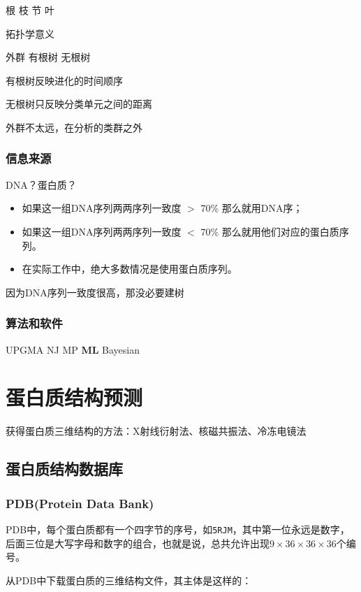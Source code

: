 根 枝 节 叶

拓扑学意义

外群 有根树 无根树

有根树反映进化的时间顺序

无根树只反映分类单元之间的距离

外群不太远，在分析的类群之外

\subsubsection{信息来源}

DNA？蛋白质？

\begin{itemize}
	\item 如果这一组DNA序列两两序列一致度 $>$ 70\% 那么就用DNA序；
	\item 如果这一组DNA序列两两序列一致度 $<$ 70\% 那么就用他们对应的蛋白质序列。
	\item 在实际工作中，绝大多数情况是使用蛋白质序列。
\end{itemize}

因为DNA序列一致度很高，那没必要建树

\subsubsection{算法和软件}

UPGMA NJ MP \textbf{ML} Bayesian


\section{蛋白质结构预测}

获得蛋白质三维结构的方法：X射线衍射法、核磁共振法、冷冻电镜法

\subsection{蛋白质结构数据库}

\subsubsection{PDB(Protein Data Bank)}

PDB中，每个蛋白质都有一个四字节的序号，如\texttt{5RJM}，其中第一位永远是数字，后面三位是大写字母和数字的组合，也就是说，总共允许出现$9\times36\times36\times36$个编号。

从PDB中下载蛋白质的三维结构文件，其主体是这样的：


